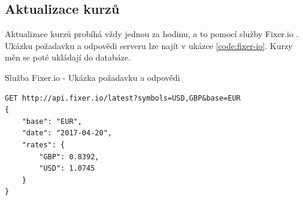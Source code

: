 \subsection{Aktualizace kurzů}
Aktualizace kurzů probíhá vždy jednou za hodinu, a to pomocí služby Fixer.io \cite{fixer-io}. Ukázku požadavku a odpovědi serveru lze najít v ukázce \ref{code:fixer-io}. Kurzy měn se poté ukládají do databáze.

\begin{listing}[h]
\caption{\label{code:fixer-io}Služba Fixer.io - Ukázka požadavku a odpovědi}
\begin{verbatim}
GET http://api.fixer.io/latest?symbols=USD,GBP&base=EUR
{
    "base": "EUR",
    "date": "2017-04-20",
    "rates": {
        "GBP": 0.8392,
        "USD": 1.0745
    }
}
\end{verbatim}
\end{listing}
